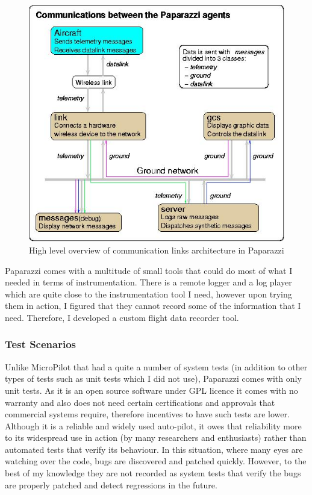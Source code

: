 \begin{figure}
    \centering
    \includegraphics[width=\columnwidth]{pprz_tester_files/Pprz_communication_agents.jpg}
    \caption{High level overview of communication links architecture in Paparazzi \cite{hattenberger2014using}}
    \label{fig:paparazzi_comm_agents}
\end{figure}

Paparazzi comes with a multitude of small tools that could do most of what I needed in terms of instrumentation. There is a remote logger and a log player which are quite close to the instrumentation tool I need, however upon trying them in action, I figured that they cannot record some of the information that I need. Therefore, I developed a custom flight data recorder tool. 

\subsubsection{Test Scenarios}
Unlike MicroPilot that had a quite a number of system tests (in addition to other types of tests such as unit tests which I did not use), Paparazzi comes with only unit tests. As it is an open source software under GPL licence it comes with no warranty and also does not need certain certifications and approvals that commercial systems require, therefore incentives to have such tests are lower. 
Although it is a reliable and widely used auto-pilot, it owes that reliability more to its widespread use in action (by many researchers and enthusiasts) rather than automated tests that verify its behaviour.
In this situation, where many eyes are watching over the code, bugs are discovered and patched quickly. However, to the best of my knowledge they are not recorded as system tests that verify the bugs are properly patched and detect regressions in the future.

